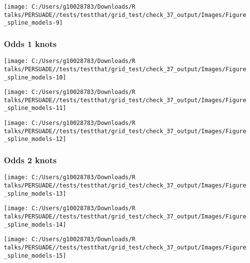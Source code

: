 \documentclass[
]{article}
\begin{document}
\begin{flushleft}\texttt{[image: C:/Users/g10028783/Downloads/R talks/PERSUADE//tests/testthat/grid\_test/check\_37\_output/Images/Figure\_spline\_models-9]} \end{flushleft}

\clearpage

\subsubsection{Odds 1 knots}\label{odds-1-knots}

\begin{flushleft}\texttt{[image: C:/Users/g10028783/Downloads/R talks/PERSUADE//tests/testthat/grid\_test/check\_37\_output/Images/Figure\_spline\_models-10]} \end{flushleft}

\begin{flushleft}\texttt{[image: C:/Users/g10028783/Downloads/R talks/PERSUADE//tests/testthat/grid\_test/check\_37\_output/Images/Figure\_spline\_models-11]} \end{flushleft}

\begin{flushleft}\texttt{[image: C:/Users/g10028783/Downloads/R talks/PERSUADE//tests/testthat/grid\_test/check\_37\_output/Images/Figure\_spline\_models-12]} \end{flushleft}

\clearpage

\subsubsection{Odds 2 knots}\label{odds-2-knots}

\begin{flushleft}\texttt{[image: C:/Users/g10028783/Downloads/R talks/PERSUADE//tests/testthat/grid\_test/check\_37\_output/Images/Figure\_spline\_models-13]} \end{flushleft}

\begin{flushleft}\texttt{[image: C:/Users/g10028783/Downloads/R talks/PERSUADE//tests/testthat/grid\_test/check\_37\_output/Images/Figure\_spline\_models-14]} \end{flushleft}

\begin{flushleft}\texttt{[image: C:/Users/g10028783/Downloads/R talks/PERSUADE//tests/testthat/grid\_test/check\_37\_output/Images/Figure\_spline\_models-15]} \end{flushleft}
\end{document}
